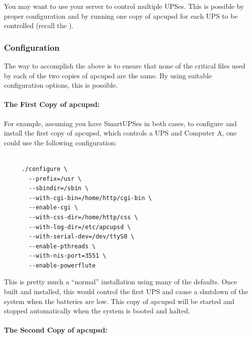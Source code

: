 {{{{{{{{{You may want to use your server to control multiple UPSes. This is possible by
proper configuration and by running one copy of apcupsd for each UPS to be
controlled (recall the 
). 

\label{Configuration}

\subsubsection*{Configuration}

The way to accomplish the above is to ensure that none of the critical files
used by each of the two copies of apcupsd are the same. By using suitable
configuration options, this is possible. 

\label{The-First-Copy-of-apcupsd}

\paragraph*{The First Copy of apcupsd:}

For example, assuming you have SmartUPSes in both cases, to configure and
install the first copy of apcupsd, which controls a UPS and Computer A, one
could use the following configuration: 

\footnotesize
\begin{verbatim}
     
     ./configure \
       --prefix=/usr \
       --sbindir=/sbin \
       --with-cgi-bin=/home/http/cgi-bin \
       --enable-cgi \
       --with-css-dir=/home/http/css \
       --with-log-dir=/etc/apcupsd \
       --with-serial-dev=/dev/ttyS0 \
       --enable-pthreads \
       --with-nis-port=3551 \
       --enable-powerflute
\end{verbatim}
\normalsize

This is pretty much a ``normal'' installation using many of the defaults. Once
built and installed, this would control the first UPS and cause a shutdown of
the system when the batteries are low.  This copy of apcupsd will be started
and stopped automatically when the system is booted and halted. 

\label{The-Second-Copy-of-apcupsd}

\paragraph*{The Second Copy of apcupsd:}

}}}}}}}}}
